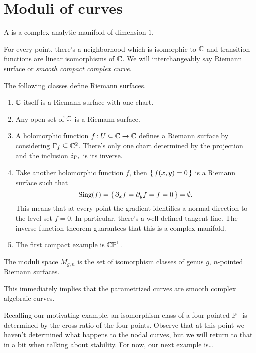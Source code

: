 \documentclass[12pt]{memoir}
\begin{document}
\section{Moduli of curves}

\begin{Def}
    A  is a complex analytic manifold of dimension $1$. 
\end{Def}

For every point, there's a neighborhood which is isomorphic to $\mathbb{C}$ and transition functions are linear isomorphisms of $\mathbb{C}$. We will interchangeably say Riemann surface or \emph{smooth compact complex curve}.
    
\begin{Ex}
        The following classes define Riemann surfaces.
        \begin{enumerate}
        \item $\mathbb{C}$ itself is a Riemann surface with one chart.
        \item Any open set of $\mathbb{C}$ is a Riemann surface.
        \item A holomorphic function $f\mathbin{:} U\subseteq\mathbb{C}\to\mathbb{C}$ defines a Riemann surface by considering $\Gamma_f\subseteq\mathbb{C}^2$. There's only one chart determined by the projection and the inclusion $i_{\Gamma_f}$ is its inverse.
        \item Take another holomorphic function $f$, then $\{\,f(x,y)=0\,\}$ is a Riemann surface such that 
        $$\text{Sing}(f)=\{\,\partial_xf=\partial_yf=f=0\,\}=\emptyset.$$
        This means that at every point the gradient identifies a normal direction to the level set $f=0$. In particular, there's a well defined tangent line. The inverse function theorem guarantees that this is a complex manifold. 
        \item The first compact example is $\mathbb{CP}^1$.
        \end{enumerate}
\end{Ex} 

\begin{Def}
    The moduli space $M_{g,n}$ is the set of isomorphism classes of genus $g$, $n$-pointed Riemann surfaces.
\end{Def}

\begin{Rmk}
This immediately implies that the parametrized curves are smooth complex algebraic curves.
\end{Rmk}

Recalling our motivating example, an isomorphism class of a four-pointed $\mathbb{P}^1$ is determined by the cross-ratio of the four points. Observe that at this point we haven't determined what happens to the nodal curves, but we will return to that in a bit when talking about stability. For now, our next example is\dots
\end{document}
